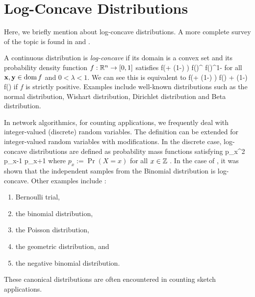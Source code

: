 \section{Log-Concave Distributions}

Here, we briefly mention about log-concave distributions. A more complete survey 
of the topic is found in \cite{An95LogConcave} and \cite{Saumard14LogConcave}.

A continuous distribution is \textit{log-concave} if its domain is a convex set and its
probability density function $f : \mathbb R^n \to [0,1]$ satisfies
\be
f(\lambda \bx + (1-\lambda) \by) \ge 	f(\bx)^{\lambda} f(\by)^{1-\lambda}
\label{eq:log_concave}
\ee
for all $\mathbf{x}, \mathbf{y} \in \text{dom}\,f$ and $0 < \lambda < 1$. We can see this is
equivalent to 
\ben
\log f(\lambda \bx + (1-\lambda) \by) \ge 	\lambda \log f(\bx) + (1-\lambda) \log f(\by)
\een
if $f$ is strictly positive. Examples include well-known distributions such as 
the normal distribution, Wishart distribution, Dirichlet distribution and Beta distribution.

In network algorithmics, for counting applications, we frequently deal with integer-valued (discrete)
random variables. The definition can be extended for integer-valued random variables with modifications. In
the discrete case, log-concave distributions are defined as probability mass functions satisfying
\ben
p_x^2 \ge p_{x-1} p_{x+1}
\een
where $p_x := \Pr(X = x)$ for all $x \in \mathbb Z$ \cite{Keilson71DiscreteUni}. In the case of 
\cite[Theorem 1]{Hua08BRICK,Hua08BRICKJournal}, it was
shown that the independent samples from the Binomial distribution is log-concave. Other examples include
\cite{An95LogConcave,Keilson71DiscreteUni}:
\begin{enumerate}
\item Bernoulli trial,
\item the binomial distribution,
\item the Poisson distribution,
\item the geometric distribution, and
\item the negative binomial distribution.
\end{enumerate}
These canonical distributions are often encountered in counting sketch applications.

